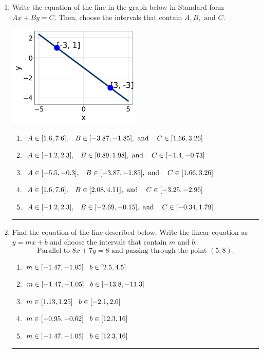 \documentclass[14pt]{extbook}
\newcommand{\litem}[1]{\item#1\hspace*{-1cm}\rule{\textwidth}{0.4pt}}
\begin{document}
\begin{enumerate}
{\begin{enumerate}[label=\Alph*.]
\end{enumerate} }
\litem{
Write the equation of the line in the graph below in Standard form $Ax+By=C$. Then, choose the intervals that contain $A, B, \text{ and } C$.
\begin{center}
    \includegraphics[width=0.5\textwidth]{../Figures/linearGraphToStandardCopyA.png}
\end{center}
\begin{enumerate}[label=\Alph*.]
\item \( A \in [1.6, 7.6], \hspace{3mm} B \in [-3.87, -1.85], \text{ and } \hspace{3mm} C \in [1.66, 3.26] \)
\item \( A \in [-1.2, 2.3], \hspace{3mm} B \in [0.89, 1.98], \text{ and } \hspace{3mm} C \in [-1.4, -0.73] \)
\item \( A \in [-5.5, -0.3], \hspace{3mm} B \in [-3.87, -1.85], \text{ and } \hspace{3mm} C \in [1.66, 3.26] \)
\item \( A \in [1.6, 7.6], \hspace{3mm} B \in [2.08, 4.11], \text{ and } \hspace{3mm} C \in [-3.25, -2.96] \)
\item \( A \in [-1.2, 2.3], \hspace{3mm} B \in [-2.69, -0.15], \text{ and } \hspace{3mm} C \in [-0.34, 1.79] \)

\end{enumerate} }
\litem{
Find the equation of the line described below. Write the linear equation as $ y=mx+b $ and choose the intervals that contain $m$ and $b$.\[ \text{Parallel to } 8 x + 7 y = 8 \text{ and passing through the point } (5, 8). \]\begin{enumerate}[label=\Alph*.]
\item \( m \in [-1.47, -1.05] \hspace*{3mm} b \in [2.5, 4.5] \)
\item \( m \in [-1.47, -1.05] \hspace*{3mm} b \in [-13.8, -11.3] \)
\item \( m \in [1.13, 1.25] \hspace*{3mm} b \in [-2.1, 2.6] \)
\item \( m \in [-0.95, -0.62] \hspace*{3mm} b \in [12.3, 16] \)
\item \( m \in [-1.47, -1.05] \hspace*{3mm} b \in [12.3, 16] \)


\end{enumerate}}
\end{enumerate}
\end{document}
